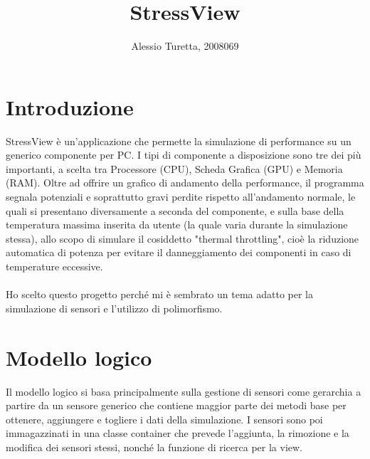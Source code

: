 \documentclass[10pt]{article}
\title{StressView}
\author{Alessio Turetta, 2008069}
\date{}
\begin{document}
\maketitle
\tableofcontents
\newpage

\section{Introduzione}
StressView è un'applicazione che permette la simulazione di
performance su un generico componente per PC.
I tipi di componente a disposizione sono tre dei più importanti, a scelta tra
Processore (CPU), Scheda Grafica (GPU) e Memoria (RAM).
Oltre ad offrire un grafico di andamento della performance, il programma segnala
potenziali e soprattutto gravi perdite rispetto all'andamento normale,
le quali si presentano diversamente a seconda del componente,
e sulla base della temperatura massima inserita da utente (la quale varia
durante la simulazione stessa), allo scopo di simulare il cosiddetto "thermal
throttling", cioè la riduzione automatica di potenza per evitare il danneggiamento
dei componenti in caso di temperature eccessive.
\\\\
Ho scelto questo progetto perché mi è sembrato un tema adatto per la simulazione
di sensori e l'utilizzo di polimorfismo.

\section{Modello logico}
Il modello logico si basa principalmente sulla gestione di sensori come gerarchia
a partire da un sensore generico che contiene maggior parte dei metodi base
per ottenere, aggiungere e togliere i dati della simulazione.
I sensori sono poi immagazzinati in una classe container che prevede l'aggiunta,
la rimozione e la modifica dei sensori stessi, nonché la funzione di ricerca per la view.
\end{document}
